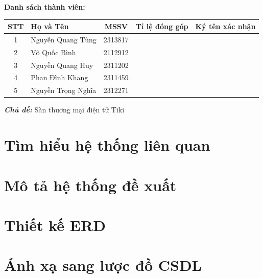 \documentclass[a4paper,12pt]{article}
\begin{document}
\begin{center}

    \textbf{\large Danh sách thành viên:} \\
    \vspace{0.3cm}
    \renewcommand{\arraystretch}{1.5}
    \begin{tabular}{|c|l|c|c|c|}
        \hline
        \textbf{STT} & \textbf{Họ và Tên} & \textbf{MSSV} & \textbf{Tỉ lệ đóng góp} & \textbf{Ký tên xác nhận} \\
        \hline
        1 & \large Nguyễn Quang Tùng & 2313817 &  & \\
        \hline
        2 & \large Võ Quốc Bình & 2112912 &  & \\
        \hline
        3 & \large Nguyễn Quang Huy & 2311202 &  & \\
        \hline
        4 & \large Phan Đình Khang & 2311459 &  & \\
        \hline
        5 & \large Nguyễn Trọng Nghĩa & 2312271 &  & \\
        \hline
    \end{tabular}
\end{center}
\large\textbf{\textit{Chủ đề:}} \large Sàn thương mại điện tử Tiki

\newpage
\tableofcontents
\newpage
\section{Tìm hiểu hệ thống liên quan}


\section{Mô tả hệ thống đề xuất}

\section{Thiết kế ERD}
\section{Ánh xạ sang lược đồ CSDL}
\end{document}
